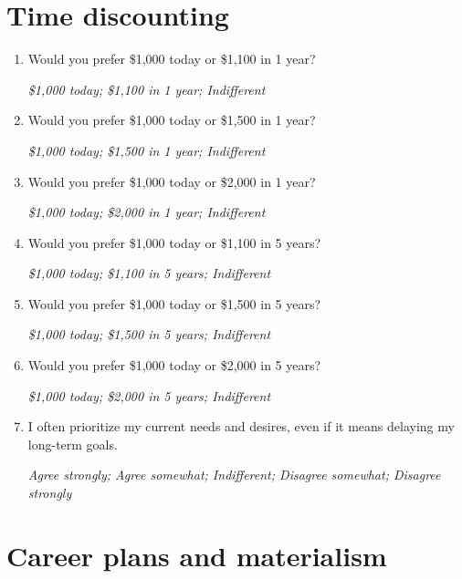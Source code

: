 \documentclass[11pt, headsepline]{article}
\begin{document}
\section*{Time discounting}

\begin{enumerate}[resume]

    \item Would you prefer \$1,000 today or \$1,100 in 1 year?

    \textit{\$1,000 today; \$1,100 in 1 year; Indifferent}

    \item Would you prefer \$1,000 today or \$1,500 in 1 year?

    \textit{\$1,000 today; \$1,500 in 1 year; Indifferent}

    \item Would you prefer \$1,000 today or \$2,000 in 1 year?

    \textit{\$1,000 today; \$2,000 in 1 year; Indifferent}

    \item Would you prefer \$1,000 today or \$1,100 in 5 years?

    \textit{\$1,000 today; \$1,100 in 5 years; Indifferent}

    \item Would you prefer \$1,000 today or \$1,500 in 5 years?

    \textit{\$1,000 today; \$1,500 in 5 years; Indifferent}

    \item Would you prefer \$1,000 today or \$2,000 in 5 years?

    \textit{\$1,000 today; \$2,000 in 5 years; Indifferent}

    \item I often prioritize my current needs and desires, even if it means delaying my long-term goals.

    \textit{Agree strongly; Agree somewhat; Indifferent; Disagree somewhat; Disagree strongly}
    
\end{enumerate}


\section*{Career plans and materialism}
\end{document}
